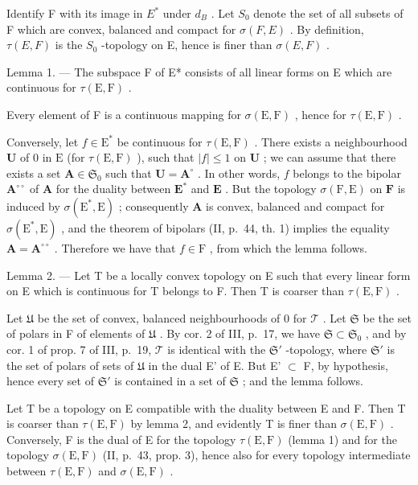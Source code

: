 Identify F with its image in \(E^{*}\) under \(d_{B}\) . Let \(S_{0}\) denote the set of all subsets of F which are convex, balanced and compact for \(\sigma(F, E)\) . By definition, \(\tau(E, F)\) is the \(S_{0}\) -topology on E, hence is finer than \(\sigma(E, F)\) .

Lemma 1. --- The subspace F of E* consists of all linear forms on E which are continuous for \(\tau(\mathrm{E},\mathrm{F})\) .

Every element of F is a continuous mapping for \(\sigma(\mathrm{E},\mathrm{F})\) , hence for \(\tau(\mathrm{E},\mathrm{F})\) .

Conversely, let \(f \in \mathrm{E}^*\) be continuous for \(\tau(\mathrm{E}, \mathrm{F})\) . There exists a neighbourhood \(\mathbf{U}\) of 0 in \(\mathrm{E}\) (for \(\tau(\mathrm{E}, \mathrm{F})\) ), such that \(|f| \leqslant 1\) on \(\mathbf{U}\) ; we can assume that there exists a set \(\mathbf{A} \in \mathfrak{S}_0\) such that \(\mathbf{U} = \mathbf{A}^\circ\) . In other words, \(f\) belongs to the bipolar \(\mathbf{A}^{\circ\circ}\) of \(\mathbf{A}\) for the duality between \(\mathbf{E}^*\) and \(\mathbf{E}\) . But the topology \(\sigma(\mathrm{F}, \mathrm{E})\) on \(\mathbf{F}\) is induced by \(\sigma(\mathrm{E}^*, \mathrm{E})\) ; consequently \(\mathbf{A}\) is convex, balanced and compact for \(\sigma(\mathrm{E}^*, \mathrm{E})\) , and the theorem of bipolars (II, p.~44, th. 1) implies the equality \(\mathbf{A} = \mathbf{A}^{\circ\circ}\) . Therefore we have that \(f \in \mathrm{F}\) , from which the lemma follows.

Lemma 2. --- Let T be a locally convex topology on E such that every linear form on E which is continuous for T belongs to F. Then T is coarser than \(\tau(\mathrm{E}, \mathrm{F})\) .

Let \(\mathfrak{U}\) be the set of convex, balanced neighbourhoods of 0 for \(\mathcal{T}\) . Let \(\mathfrak{S}\) be the set of polars in F of elements of \(\mathfrak{U}\) . By cor. 2 of III, p.~17, we have \(\mathfrak{S} \subset \mathfrak{S}_0\) , and by cor. 1 of prop. 7 of III, p.~19, \(\mathcal{T}\) is identical with the \(\mathfrak{S}'\) -topology, where \(\mathfrak{S}'\) is the set of polars of sets of \(\mathfrak{U}\) in the dual E' of E. But E' \(\subset\) F, by hypothesis, hence every set of \(\mathfrak{S}'\) is contained in a set of \(\mathfrak{S}\) ; and the lemma follows.

Let T be a topology on E compatible with the duality between E and F. Then T is coarser than \(\tau(\mathrm{E},\mathrm{F})\) by lemma 2, and evidently T is finer than \(\sigma(\mathrm{E},\mathrm{F})\) . Conversely, F is the dual of E for the topology \(\tau(\mathrm{E},\mathrm{F})\) (lemma 1) and for the topology \(\sigma(\mathrm{E},\mathrm{F})\) (II, p.~43, prop. 3), hence also for every topology intermediate between \(\tau(\mathrm{E},\mathrm{F})\) and \(\sigma(\mathrm{E},\mathrm{F})\) .

